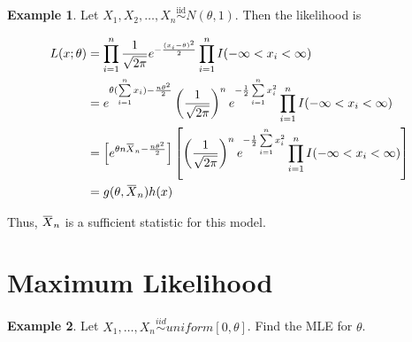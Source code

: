 \documentclass[12pt]{article}
\newcommand{\overbar}[1]{\mkern 1.5mu\overline{\mkern-1.5mu#1\mkern-1.5mu}\mkern 1.5mu}
\theoremstyle{definition}
\newtheorem*{example}{Example}
\begin{document}
\begin{example}
Let $X_1, X_2, \ldots, X_n \overset{\text{iid}}{\sim} N(\theta, 1)$. Then the 
likelihood is

\begin{align*}
L(x; \theta) &= \prod_{i = 1}^n \frac{1}{\sqrt{2 \pi}} e^{-\frac{(x_i - \theta)^2}{2}}
\prod_{i = 1}^n I(-\infty < x_i < \infty) \\
&= e^{\theta (\sum\limits_{i = 1}^n x_i) - \frac{n \theta^2}{2}} \left( \frac{1}{\sqrt{2\pi}} \right)^n
e^{-\frac{1}{2} \sum\limits_{i = 1}^n x_i^2} \prod_{i = 1}^n I(-\infty < x_i < \infty) \\
&= \left[ e^{\theta n \overbar{X}_n - \frac{n \theta^2}{2}} \right] \left[ \left( \frac{1}{\sqrt{2\pi}} \right)^n
e^{-\frac{1}{2} \sum\limits_{i = 1}^n x_i^2} \prod_{i = 1}^n I(-\infty < x_i < \infty) \right] \\
&= g(\theta, \overbar{X}_n)h(x)
\end{align*}

Thus, $\overbar{X}_n$ is a sufficient statistic for this model.

\end{example}

\section{Maximum Likelihood}

\begin{example}
Let $X_1, \ldots, X_n \overset{iid}{\sim} uniform[0,\theta]$. Find the MLE for $\theta$.
\end{example}
\end{document}

